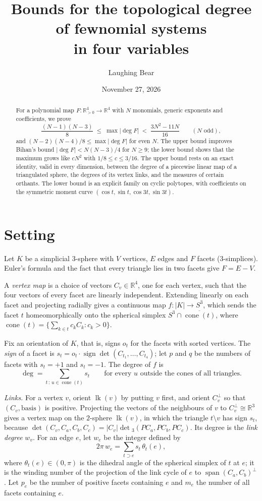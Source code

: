 \documentclass[11pt]{article}
\title{Bounds for the topological degree of fewnomial systems\\ in four variables}
\author{Laughing Bear}
\date{November 27, 2026}
\theoremstyle{remark}
\newcommand{\R}{\mathbb{R}}
\newcommand{\cone}{\operatorname{cone}}
\newcommand{\sgn}{\operatorname{sign}}
\newcommand{\lk}{\operatorname{lk}}
\begin{document}
\maketitle

\begin{abstract}
For a polynomial map $F\colon\R^4_{>0}\to\R^4$ with $N$ monomials, generic exponents and coefficients, we prove
\[
\frac{(N-1)(N-3)}{8}\;\le\;\max|\deg F|\;<\;\frac{3N^2-11N}{16}\qquad(N\text{ odd}),
\]
and $(N-2)(N-4)/8\le\max|\deg F|$ for even $N$. The upper bound improves Bihan's bound $|\deg F|<N(N-3)/4$ for $N\ge 9$; the lower bound shows that the maximum grows like $cN^2$ with $1/8\le c\le 3/16$. The upper bound rests on an exact identity, valid in every dimension, between the degree of a piecewise linear map of a triangulated sphere, the degrees of its vertex links, and the measures of certain orthants. The lower bound is an explicit family on cyclic polytopes, with coefficients on the symmetric moment curve $(\cos t,\sin t,\cos 3t,\sin 3t)$.
\end{abstract}

\section{Setting}
Let $K$ be a simplicial $3$-sphere with $V$ vertices, $E$ edges and $F$ facets ($3$-simplices). Euler's formula and the fact that every triangle lies in two facets give $F=E-V$.

A \emph{vertex map} is a choice of vectors $C_v\in\R^4$, one for each vertex, such that the four vectors of every facet are linearly independent. Extending linearly on each facet and projecting radially gives a continuous map $f\colon|K|\to S^3$, which sends the facet $t$ homeomorphically onto the spherical simplex $S^3\cap\overline{\cone(t)}$, where $\cone(t)=\{\sum_{k\in t}c_kC_k: c_k>0\}$.

Fix an orientation of $K$, that is, signs $o_t$ for the facets with sorted vertices. The \emph{sign} of a facet is $s_t=o_t\cdot\sgn\det(C_{t_1},\dots,C_{t_4})$; let $p$ and $q$ be the numbers of facets with $s_t=+1$ and $s_t=-1$. The degree of $f$ is
\begin{equation}\label{eq:count}
\deg=\sum_{t\,:\,u\in\cone(t)}s_t\qquad\text{for every $u$ outside the cones of all triangles.}
\end{equation}

\emph{Links.} For a vertex $v$, orient $\lk(v)$ by putting $v$ first, and orient $C_v^\perp$ so that $(C_v,\text{basis})$ is positive. Projecting the vectors of the neighbours of $v$ to $C_v^\perp\cong\R^3$ gives a vertex map on the $2$-sphere $\lk(v)$, in which the triangle $t\setminus v$ has sign $s_t$, because $\det(C_v,C_a,C_b,C_c)=|C_v|\det{}_3(PC_a,PC_b,PC_c)$. Its degree is the \emph{link degree} $w_v$. For an edge $e$, let $w_e$ be the integer defined by
\[
2\pi\,w_e=\sum_{t\supset e}s_t\,\theta_t(e),
\]
where $\theta_t(e)\in(0,\pi)$ is the dihedral angle of the spherical simplex of $t$ at $e$; it is the winding number of the projection of the link cycle of $e$ to $\operatorname{span}(C_a,C_b)^\perp$. Let $p_e$ be the number of positive facets containing $e$ and $m_e$ the number of all facets containing $e$.
\end{document}
